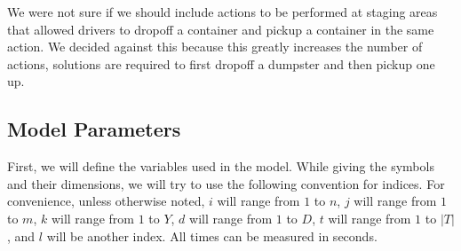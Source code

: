\documentclass{article}
\begin{document}
We were not sure if we should include actions to be performed at staging areas that allowed drivers to dropoff a container and pickup a container in the same action.
We decided against this because this greatly increases the number of actions, solutions are required to first dropoff a dumpster and then pickup one up.

\subsection{Model Parameters}

First, we will define the variables used in the model.
While giving the symbols and their dimensions, we will try to use the following convention for indices.
For convenience, unless otherwise noted, 
$i$ will range from $1$ to $n$,
$j$ will range from $1$ to $m$,
$k$ will range from $1$ to $Y$,
$d$ will range from $1$ to $D$,
$t$ will range from $1$ to $|T|$,
and $l$ will be another index.
All times can be measured in seconds.
\end{document}
